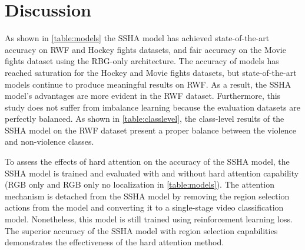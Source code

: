 \documentclass[review]{elsarticle}
\begin{document}
\begin{table}[!htbp]
\centering
\caption{SSHA Class-level evluation results. }
\label{table:statistics}
\end{table}


\section{Discussion}
\label{Discussion}


As shown in \autoref{table:models} the SSHA model has achieved state-of-the-art accuracy on RWF and Hockey fights datasets, and fair accuracy on the Movie fights dataset using the RBG-only architecture. The accuracy of models has reached saturation for the Hockey and Movie fights datasets, but state-of-the-art models continue to produce meaningful results on RWF. As a result, the SSHA model's advantages are more evident in the RWF dataset. Furthermore, this study does not suffer from imbalance learning because the evaluation datasets are perfectly balanced. As shown in \autoref{table:classlevel}, the class-level results of the SSHA model on the RWF dataset present a proper balance between the violence and non-violence classes.

To assess the effects of hard attention on the accuracy of the SSHA model, the SSHA model is trained and evaluated with and without hard attention capability (RGB only and RGB only no localization in \autoref{table:models}). The attention mechanism is detached from the SSHA model by removing the region selection actions from the model and converting it to a single-stage video classification model. Nonetheless, this model is still trained using reinforcement learning loss. The superior accuracy of the SSHA model with region selection capabilities demonstrates the effectiveness of the hard attention method.
\end{document}
